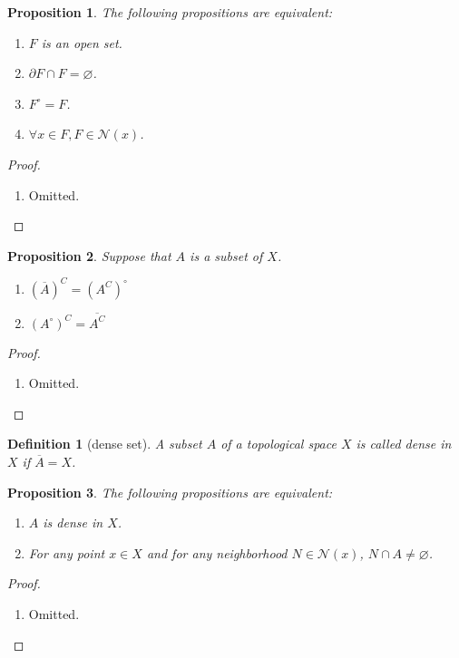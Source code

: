 \documentclass{report}
\newtheorem{definition}{Definition}[section]
\newtheorem{proposition}{Proposition}[section]
\theoremstyle{nonumberplain}
\newtheorem{proof}{Proof.}
\begin{document}
\begin{proposition}
	The following propositions are equivalent:
	\begin{enumerate}
		\item $F$ is an open set.
		\item $\partial F\cap F=\varnothing$.
		\item $F^\circ=F$.
		\item $\forall x\in F,F\in \mathcal{N}(x)$.
	\end{enumerate}
\end{proposition}
\begin{proof}~\\ \vspace{-1em}
	\begin{enumerate}
		\item Omitted.
	\end{enumerate}
\end{proof}

\begin{proposition}
	Suppose that $A$ is a subset of $X$.
	\begin{enumerate}
		\item $(\overline{A})^C=(A^C)^{\circ}$
		\item $(A^{\circ})^C=\overline{A^C}$
	\end{enumerate}
\end{proposition}
\begin{proof}~\\ \vspace{-1em}
	\begin{enumerate}
		\item Omitted.
	\end{enumerate}
\end{proof}

\begin{definition}[dense set]
	A subset $A$ of a topological space $X$ is called dense in $X$ if  $\overline{A}=X$.
\end{definition}
\begin{proposition}
	The following propositions are equivalent:
	\begin{enumerate}
		\item $A$ is dense in $X$.
		\item For any point $x \in X$ and for any neighborhood $N\in\mathcal{N}(x)$, $N\cap A\ne \varnothing$.
	\end{enumerate}
\end{proposition}
\begin{proof}~\\ \vspace{-1em}
	\begin{enumerate}
		\item Omitted.
	\end{enumerate}
\end{proof}
\end{document}
